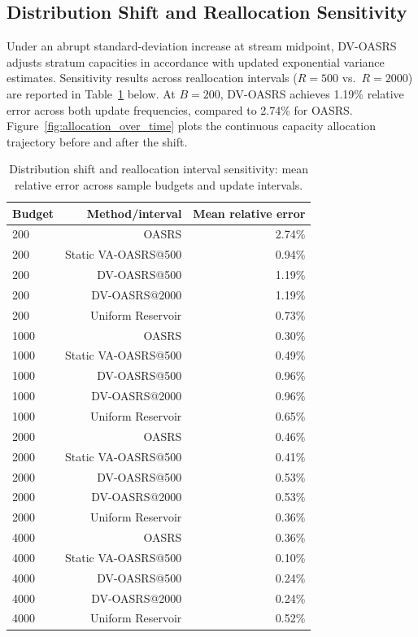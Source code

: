 \documentclass[conference]{IEEEtran}
\begin{document}
\subsection{Distribution Shift and Reallocation Sensitivity}

Under an abrupt standard-deviation increase at stream midpoint, DV-OASRS adjusts stratum capacities in accordance with updated exponential variance estimates. Sensitivity results across reallocation intervals ($R=500$ vs.\ $R=2000$) are reported in Table~\ref{tab:distribution_shift} below. At $B=200$, DV-OASRS achieves 1.19\% relative error across both update frequencies, compared to 2.74\% for OASRS. Figure~\ref{fig:allocation_over_time} plots the continuous capacity allocation trajectory before and after the shift.

\begin{table}[!htbp]
\centering
\caption{Distribution shift and reallocation interval sensitivity: mean relative error across sample budgets and update intervals.}
\label{tab:distribution_shift}
\small
\begin{tabular}{lrr}
\toprule
\textbf{Budget} & \textbf{Method/interval} & \textbf{Mean relative error} \\
\midrule
200 & OASRS & 2.74\% \\
200 & Static VA-OASRS@500 & 0.94\% \\
200 & DV-OASRS@500 & 1.19\% \\
200 & DV-OASRS@2000 & 1.19\% \\
200 & Uniform Reservoir & 0.73\% \\
1000 & OASRS & 0.30\% \\
1000 & Static VA-OASRS@500 & 0.49\% \\
1000 & DV-OASRS@500 & 0.96\% \\
1000 & DV-OASRS@2000 & 0.96\% \\
1000 & Uniform Reservoir & 0.65\% \\
2000 & OASRS & 0.46\% \\
2000 & Static VA-OASRS@500 & 0.41\% \\
2000 & DV-OASRS@500 & 0.53\% \\
2000 & DV-OASRS@2000 & 0.53\% \\
2000 & Uniform Reservoir & 0.36\% \\
4000 & OASRS & 0.36\% \\
4000 & Static VA-OASRS@500 & 0.10\% \\
4000 & DV-OASRS@500 & 0.24\% \\
4000 & DV-OASRS@2000 & 0.24\% \\
4000 & Uniform Reservoir & 0.52\% \\
\bottomrule
\end{tabular}
\end{table}
\end{document}
